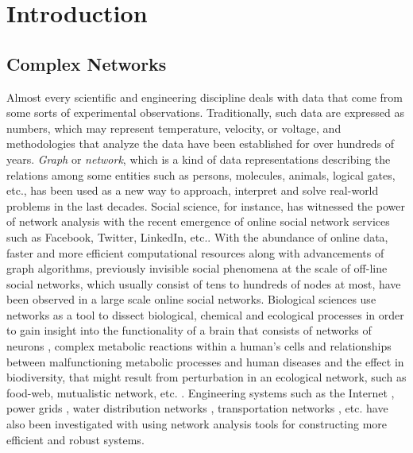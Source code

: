 \chapter{Introduction}
	\section{Complex Networks}
	Almost every scientific and engineering discipline deals with data that come from some sorts of experimental observations. Traditionally, such data are expressed as numbers, which may represent temperature, velocity, or voltage, and methodologies that analyze the data have been established for over hundreds of years. \textit{Graph} or \textit{network}, which is a kind of data representations describing the relations among some entities such as persons, molecules, animals, logical gates, etc., has been used as a new way to approach, interpret and solve real-world problems in the last decades. Social science, for instance, has witnessed the power of network analysis with the recent emergence of online social network services such as Facebook, Twitter, LinkedIn, etc.\cite{Kleinberg:1}. With the abundance of online data, faster and more efficient computational resources along with advancements of graph algorithms, previously invisible social phenomena at the scale of off-line social networks, which usually consist of tens to hundreds of nodes at most, have been observed in a large scale online social networks.  Biological sciences use networks as a tool to dissect biological, chemical and ecological processes in order to gain insight into the functionality of a brain that consists of networks of neurons \cite{BrainNetwork}, complex metabolic reactions within a human's cells and relationships between malfunctioning metabolic processes and human diseases \cite{MetabolicNetworkAndDiseases} and the effect in biodiversity, that might result from perturbation in an ecological network, such as food-web, mutualistic network, etc. \cite{EcologicalNetwork}. Engineering systems such as the Internet \cite{Internet}, power grids \cite{PowerGrid}, water distribution networks \cite{WaterDistribution}, transportation networks \cite{Train}, etc. have also been investigated with using network analysis tools for constructing more efficient and robust systems. 
	
